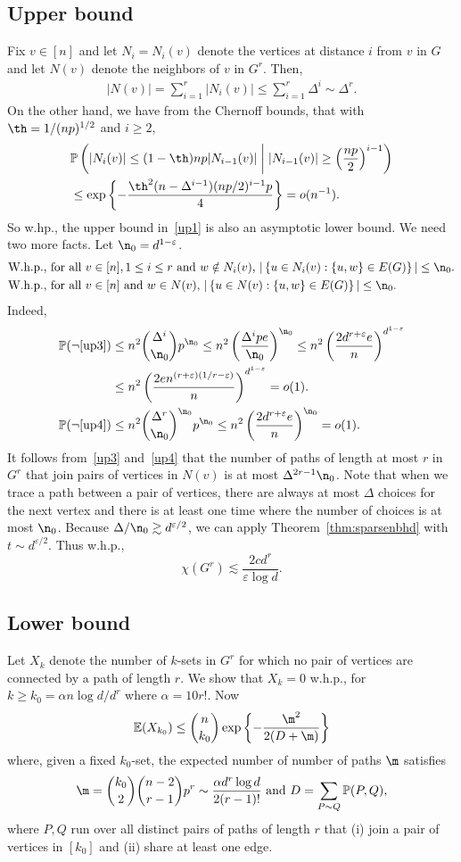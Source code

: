 \documentclass[12pt,a4paper]{article}
\def\a{\alpha} \def\b{\beta} \def\d{\delta} \def\D{\Delta}
\def\e{\varepsilon} \def\f{\phi} \def\F{{\Phi}} \def\vp{\varphi} \def\g{\gamma}
\newcommand{\brac}[1]{\left(#1\right)}
\newcommand{\bfrac}[2]{\left(\frac{#1}{#2}\right)}
\newcommand{\set}[1]{\left\{#1\right\}}
\def\E{\mathbb{E}}
\def\Pr{\mathbb{P}}
\newcommand{\beq}[2]{\begin{align}\label{#1}#2\end{align}}
\theoremstyle{plain}
\begin{document}
\subsection{Upper bound}
Fix $v\in [n]$ and let $N_i=N_i(v)$ denote the vertices at distance $i$ from $v$ in $G$ and let $N(v)$ denote the neighbors of $v$ in $G^r$. Then,
\beq{up1}{
|N(v)| =\sum_{i=1}^r|N_i(v)|\leq  \sum_{i=1}^r\D^i \sim \D^r.
}
On the other hand, we have from the Chernoff bounds, that with $\th=1/(np)^{1/2}$ and $i\geq 2$,
\beq{up2}{
&\Pr\brac{|N_i(v)|\leq (1-\th)np|N_{i-1}(v)|\;\bigg|\; |N_{i-1}(v)|\geq \bfrac{np}{2}^{i-1}}\nonumber\\
&\leq \exp\set{-\frac{\th^2(n-\D^{i-1})(np/2)^{i-1}p}{4}}=o(n^{-1}).
}
So w.hp., the upper bound in~\eqref{up1} is also an asymptotic lower bound. We need two more facts. Let $\n_0=d^{1-\e}$.
\begin{align}
&\text{W.h.p., for all $v\in[n], 1\leq i\leq r$ and $w\notin N_i(v)$, $|\set{u\in N_i(v):\set{u,w}\in E(G)}|\leq \n_0.$}\label{up3}\\
&\text{W.h.p., for all $v\in[n]$ and $w\in N(v)$, $|\set{u\in N(v):\set{u,w}\in E(G)}|\leq \n_0$.}\label{up4}
\end{align}
Indeed,
\begin{align*}
\Pr(\neg\eqref{up3})&\leq n^2\binom{\D^i}{\n_0}p^{\n_0}\leq n^2\bfrac{\D^ipe}{\n_0}^{\n_0}\leq n^2\bfrac{2d^{r+\e}e}{n}^{d^{1-\e}}\\&\leq n^2\bfrac{2en^{(r+\e)(1/r-\e)}}{n}^{d^{1-\e}}=o(1).\\
\Pr(\neg\eqref{up4})&\leq n^2\binom{\D^r}{\n_0}^{\n_0}p^{\n_0}\leq n^2\bfrac{2d^{r+\e}e}{n}^{\n_0}=o(1).
\end{align*}
It follows from~\eqref{up3} and~\eqref{up4} that the number of paths of length at most $r$ in $G^r$ that join pairs of vertices in $N(v)$ is at most $\D^{2r-1}\n_0$. Note that when we trace a path between a pair of vertices, there are always at most $\D$ choices for the next vertex and there is at least one time where the number of choices is at most $\n_0$. Because $\D/\n_0\gtrsim d^{\e/2}$, we can apply Theorem~\ref{thm:sparsenbhd} with $t\sim d^{\e/2}$. Thus w.h.p., 
\[
\chi(G^r)\lesssim \frac{2cd^r}{\e\log d}.%
\]
\subsection{Lower bound}
Let $X_k$ denote the number of  $k$-sets in $G^r$ for which no pair of vertices are connected by a path of length $r$. We show that $X_k=0$ w.h.p., for $k\geq k_0=\a n\log d/d^r$ where $\a=10r!$. Now
\beq{Janson}{
\E(X_{k_0})\leq \binom{n}{k_0}\exp\set{-\frac{\m^2}{2(D+\m)}}
}
where, given a fixed $k_0$-set, the expected number of number of paths $\m$ satisfies
\[
\m=\binom{k_0}{2}\binom{n-2}{r-1}p^r\sim \frac{\a d^r\log d}{2(r-1)!}\text{ and }D=\sum_{P\sim Q}\Pr(P,Q),
\]
where $P,Q$ run over all distinct pairs of paths of length $r$ that (i) join  a pair of vertices in $[k_0]$ and (ii) share at least one edge.
\end{document}

